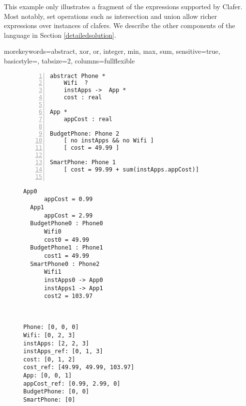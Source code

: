 \documentclass{easychair}
\begin{document}
\indent This example only illustrates a fragment of the expressions supported by Clafer. Most notably, set operations such as intersection and union allow richer expressions over instances of clafers. We describe the other components of the language in Section \ref{detailedsolution}.

{morekeywords={abstract, xor, or, integer, min, max, sum},
sensitive=true,
basicstyle={\sffamily\small},
tabsize=2,
columns=fullflexible
}


\begin{figure}[!t]
\par\noindent
\begin{minipage}[t]{.33\textwidth}
\begin{lstlisting}[language=clafer, numbers=left, caption=Clafer specification of two types of phones and apps., label={listing:ClaferPhone}]
abstract Phone *
	Wifi  ?
	instApps ->  App *
	cost : real

App *
	appCost : real

BudgetPhone: Phone 2
	[ no instApps && no Wifi ]
	[ cost = 49.99 ]	

SmartPhone: Phone 1
	[ cost = 99.99 + sum(instApps.appCost)]	
 
\end{lstlisting}%
\end{minipage}%
\hfill
\begin{minipage}[t]{.32\textwidth}
\begin{lstlisting}[language=clafer, caption=A generated model of a mobile phone and its apps in Clafer., label={listing:ClaferPhoneInstance}]
  App0
	  appCost = 0.99
  App1
	  appCost = 2.99
  BudgetPhone0 : Phone0
	  Wifi0
      cost0 = 49.99
  BudgetPhone1 : Phone1
  	  cost1 = 49.99
  SmartPhone0 : Phone2
	  Wifi1
	  instApps0 -> App0
	  instApps1 -> App1
	  cost2 = 103.97
\end{lstlisting}%
\end{minipage}%
\hfill
\begin{minipage}[t]{.32\textwidth}
\begin{lstlisting}[language=clafer, caption=The variables associated with each clafer in Z3\, corresponding to Listing 2., label={listing:ClaferPhoneZ3}]


Phone: [0, 0, 0]
Wifi: [0, 2, 3]
instApps: [2, 2, 3]
instApps_ref: [0, 1, 3]
cost: [0, 1, 2]
cost_ref: [49.99, 49.99, 103.97]
App: [0, 0, 1]
appCost_ref: [0.99, 2.99, 0]
BudgetPhone: [0, 0]
SmartPhone: [0]
\end{lstlisting}%
\end{minipage}%
\end{figure}
\end{document}
